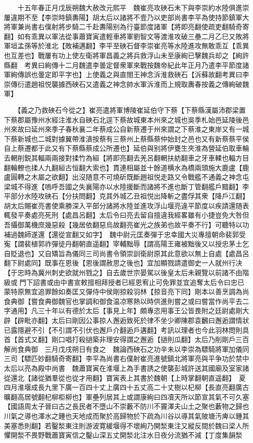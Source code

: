 　　十五年春正月戊辰朔魏大赦改元熙平　魏崔亮攻硤石未下與李崇約水陸俱進崇屢違期不至【李崇時鎮夀陽】胡太后以諸將不壹乃以吏部尚書李平為使持節鎮軍大將軍兼尚書右僕射將步騎二千赴夀陽别為行臺節度諸軍【將即亮翻使疏吏翻騎奇寄翻】如有乖異以軍法從事蕭寶寅遣輕車將軍劉智文等渡淮攻破三壘二月乙巳又敗將軍垣孟孫等於淮北【敗補邁翻】李平至硤石督李崇崔亮等水陸進攻無敢乖互【乖異也互差也】戰屢有功上使左衛將軍昌義之將兵救浮山未至康絢已擊魏兵却之【絢許縣翻　考異曰絢傳十二月魏遣李曇定督衆軍來戰按魏帝紀此年正月乃遣李平節度諸軍絢傳誤也曇定即平字也】上使義之與直閤王神念泝淮救硤石【泝蘇故翻考異曰李崇傳衍遣趙祖悦襲據西硤石又遣義之神念帥水軍泝淮而上規取夀春按義之傳絢破魏軍】

　　【義之乃救硤石今從之】崔亮遣將軍博陵崔延伯守下蔡【下蔡縣漢屬沛郡梁置下蔡郡屬豫州水經注淮水自硤石北逕下蔡故城東本州來之城也吳季札始邑延陵後邑州來故曰延州來季子春秋襄二年蔡成公自新蔡遷于州來謂之下蔡淮之東岸又有一城下蔡新城也二城對據翼帶淮濆按蔡有三蔡州上蔡縣蔡仲始封之邑也又有新蔡蔡平侯自上蔡遷都于此又有下蔡縣蔡成公所遷也】延伯與别將伊甕生夾淮為營延伯取車輪去輞削鋭其輻兩兩接對揉竹為絙【將即亮翻去羌呂翻輞扶紡翻車之牙車輮也輻方目翻輪轑也揉人九翻絙古恒翻大索也】貫連相屬並十餘道横水為橋兩頭施大鹿盧【鹿盧圓轉之木屬之欲翻】出沒随意不可燒斫既斷趙祖悦走路又令戰艦不通義之神念屯梁城不得進【嗚呼吾國之失襄陽亦以水陸援斷而諸將不進也斷丁管翻艦戶黯翻】李平部分水陸攻硤石【分扶問翻】克其外城乙丑祖悦出降斬之盡俘其衆【降戶江翻】胡太后賜崔亮書使乘勝深入平部分諸將水陸並進攻浮山堰亮違平節度以疾請還随表輒發平奏處亮死刑【處昌呂翻】太后令曰亮去留自擅違我經畧雖有小捷豈免大咎但吾攝御萬機庶幾惡殺【幾居依翻惡烏故翻亮崔光之族弟也故平奏不行】可聽特以功補過魏師遂還【還從宣翻又如字】　魏中尉元匡奏彈于忠幸國大災專擅朝命裴郭受寃【謂裴植郭祚彈徒丹翻朝直遥翻】宰輔黜辱【謂高陽王雍被黜後又以授忠茅土乞自貶退也】又自矯旨為儀同三司尚書令領崇訓衛尉原其此意欲以無上自處【處昌呂翻下尉處同】既事在恩後【恩後謂赦思之後也】宜加顯戮請遣御史一人就州行决【于忠時為冀州刺史欲就州戮之】自去歲世宗晏駕以後皇太后未親覽以前諸不由階級或門下詔書或由中書宣敕擅相拜授者已經恩宥止可免罪並宜追奪太后令曰忠已蒙特原無宜追罪餘如奏匡又彈侍中侯剛掠殺羽林【掠音亮下同】剛本以善烹調為尚食典御【嘗食典御魏官也掌調和御食温凉寒熱以時供進則嘗之或曰嘗當作尚平去二字通用】凡三十年以有德於太后【事見上年】頗專恣用事王公皆畏附之廷尉處剛大辟【辟毗亦翻】太后曰剛因公事掠人邂逅致死於律不坐少卿陳郡袁飜曰邂逅謂情狀已露隱避不引【不引謂不引伏也邂戶介翻逅戶遘翻】考訊以理者也今此羽林問則具首【首式又翻】剛口唱打殺撾築非理安得謂之邂逅【撾則瓜翻】太后乃削剛戶三百解尚食典御　三月戊戌朔日有食之　魏論西硤石之功辛未以李崇為驃騎將軍加儀同三司【驃匹妙翻騎奇寄翻】李平為尚書右僕射崔亮進號鎮北將軍亮與平争功於禁中太后以亮為殿中尚書　魏蕭寶寅在淮堰上為手書誘之使襲彭城許送其國廟及室家諸從還北【諸從猶羣從也從才用翻】寶寅表上其書於魏朝【上時掌翻朝直遥翻】　夏四月淮堰成長九里下廣一百四十丈上廣四十五丈高二十丈樹以杞柳【長直亮翻廣古曠翻高居號翻杞柳柜柳也】軍壘列居其上或謂康絢曰四凟天所以節宣其氣不可久塞【國語周太子晉曰古之長民者不墮山不崇藪不防川不竇澤夫山土之聚也藪物之歸也川氣之導也澤水之鍾也天地成而聚於高歸物於下疏為川谷以導其氣陂塘汚庳以鍾其美塞悉則翻】若鑿湬東注則游波寛緩堰得不壞絢乃開湬東注又縱反間於魏曰梁人所懼開湬不畏野戰蕭寶寅信之鑿山深五丈開湬北注水日夜分流猶不減【丁度集韻湬